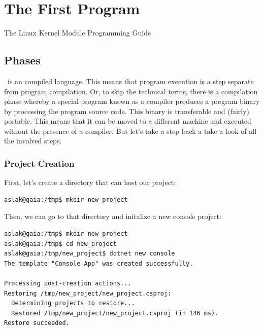 \chapter{The First Program}
\label{sec:first}

\begin{inspiration}{The Linux Kernel Module Programming Guide\cite{lkmpg20070518}}
\end{inspiration}

\section{Phases}

\csharp\ is an  compiled language. This means that program execution is a step separate from program compilation. Or, to skip the technical terms, there is a compilation phase whereby a special program known as a compiler produces a program binary by processing the program source code. This binary is transferable and (fairly) portable. This means that it can be moved to a different machine and executed without the presence of a compiler. But let's take a step back a take a look of all the involved steps.

\subsection{Project Creation}
\label{first:projectcreation}

First, let's create a directory that can host our project:

\begin{verbatim}
aslak@gaia:/tmp$ mkdir new_project
\end{verbatim}

Then, we can go to that directory and initalize a new console project:

\begin{verbatim}
aslak@gaia:/tmp$ mkdir new_project
aslak@gaia:/tmp$ cd new_project
aslak@gaia:/tmp/new_project$ dotnet new console
The template "Console App" was created successfully.

Processing post-creation actions...
Restoring /tmp/new_project/new_project.csproj:
  Determining projects to restore...
  Restored /tmp/new_project/new_project.csproj (in 146 ms).
Restore succeeded.
\end{verbatim}


